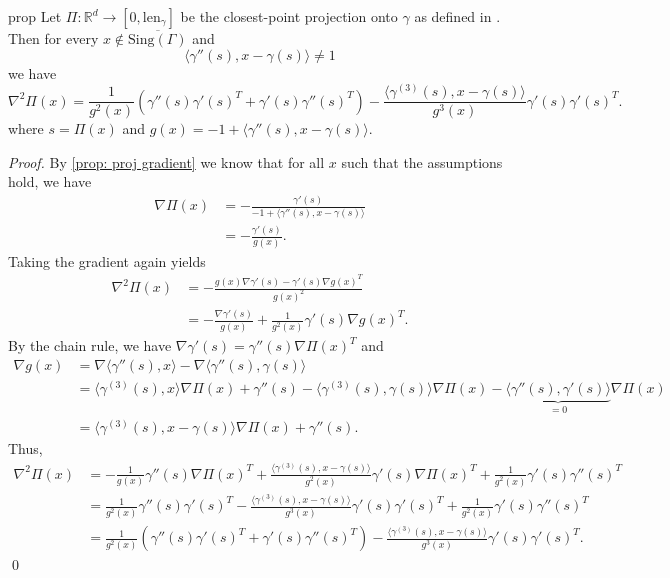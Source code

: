 \documentclass[11pt]{article}
\begin{document}
\begin{restatable}{prop}{} \label{prop: proj hessian}
    Let $\Pi: \mathbb{R}^d \rightarrow [0, \text{len}_{\gamma}]$ be the closest-point projection onto $\gamma$ as defined in . Then for every $x \notin \overline{\text{Sing}(\Gamma)}$ and 
    \[\langle\gamma''(s), x - \gamma(s)\rangle \neq 1\]
    we have
    \[\nabla^2\Pi(x) = \frac{1}{g^2(x)}\left(\gamma''(s)\gamma'(s)^T + \gamma'(s)\gamma''(s)^T\right)- \frac{\langle\gamma^{(3)}(s), x - \gamma(s)\rangle}{g^3(x)}\gamma'(s)\gamma'(s)^T.\]
    where $s = \Pi(x)$ and $g(x) = -1 + \langle\gamma''(s), x-\gamma(s)\rangle$.
\end{restatable}
\noindent \textit{Proof.} By \cref{prop: proj gradient} we know that for all $x$ such that the assumptions hold, we have
\begin{align}
    \nabla\Pi(x) &= -\frac{\gamma'(s)}{-1 + \langle\gamma''(s), x - \gamma(s)\rangle} \\
    &= -\frac{\gamma'(s)}{g(x)}.
\end{align}
Taking the gradient again yields
\begin{align}
    \nabla^2\Pi(x) &= -\frac{g(x)\nabla \gamma'(s) - \gamma'(s)\nabla g(x)^T}{g(x)^2} \\
    &= -\frac{\nabla \gamma'(s)}{g(x)} + \frac{1}{g^2(x)}\gamma'(s)\nabla g(x)^T.
\end{align}
By the chain rule, we have $\nabla\gamma'(s) = \gamma''(s)\nabla\Pi(x)^T$ and 
\begin{align}
    \nabla g(x) &= \nabla\langle\gamma''(s), x\rangle -\nabla\langle \gamma''(s), \gamma(s)\rangle \\
    &= \langle \gamma^{(3)}(s), x\rangle \nabla\Pi(x) + \gamma''(s) - \langle\gamma^{(3)}(s), \gamma(s)\rangle\nabla\Pi(x) - \underbrace{\langle\gamma''(s), \gamma'(s)\rangle}_{= 0}\nabla\Pi(x) \\
    &= \langle\gamma^{(3)}(s), x - \gamma(s)\rangle\nabla\Pi(x) + \gamma''(s).
\end{align}
Thus,
\begin{align*}
    \nabla^2\Pi(x) &= -\frac{1}{g(x)}\gamma''(s)\nabla\Pi(x)^T + \frac{\langle\gamma^{(3)}(s), x - \gamma(s)\rangle}{g^2(x)}\gamma'(s)\nabla\Pi(x)^T + \frac{1}{g^2(x)}\gamma'(s)\gamma''(s)^T \\
    &= \frac{1}{g^2(x)}\gamma''(s)\gamma'(s)^T - \frac{\langle\gamma^{(3)}(s), x - \gamma(s)\rangle}{g^3(x)}\gamma'(s)\gamma'(s)^T + \frac{1}{g^2(x)}\gamma'(s)\gamma''(s)^T \\
    &= \frac{1}{g^2(x)}\left(\gamma''(s)\gamma'(s)^T + \gamma'(s)\gamma''(s)^T\right)- \frac{\langle\gamma^{(3)}(s), x - \gamma(s)\rangle}{g^3(x)}\gamma'(s)\gamma'(s)^T.
\end{align*}
\qed{}
\end{document}

